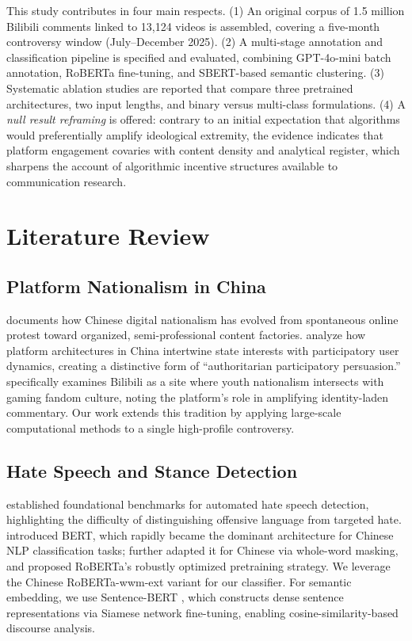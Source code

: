 \documentclass[man, 12pt, mask, floatsintext]{apa7}
\begin{document}
This study contributes in four main respects. (1) An original corpus of 1.5 million Bilibili comments linked to 13,124 videos is assembled, covering a five-month controversy window (July--December 2025). (2) A multi-stage annotation and classification pipeline is specified and evaluated, combining GPT-4o-mini batch annotation, RoBERTa fine-tuning, and SBERT-based semantic clustering. (3) Systematic ablation studies are reported that compare three pretrained architectures, two input lengths, and binary versus multi-class formulations. (4) A \textit{null result reframing} is offered: contrary to an initial expectation that algorithms would preferentially amplify ideological extremity, the evidence indicates that platform engagement covaries with content density and analytical register, which sharpens the account of algorithmic incentive structures available to communication research.

\section{Literature Review}

\subsection{Platform Nationalism in China}
\textcite{schneider2018} documents how Chinese digital nationalism has evolved from spontaneous online protest toward organized, semi-professional content factories. \textcite{repnikova2018} analyze how platform architectures in China intertwine state interests with participatory user dynamics, creating a distinctive form of ``authoritarian participatory persuasion.'' \textcite{wu2022bilibili} specifically examines Bilibili as a site where youth nationalism intersects with gaming fandom culture, noting the platform's role in amplifying identity-laden commentary. Our work extends this tradition by applying large-scale computational methods to a single high-profile controversy.

\subsection{Hate Speech and Stance Detection}
\textcite{davidson2017hate} established foundational benchmarks for automated hate speech detection, highlighting the difficulty of distinguishing offensive language from targeted hate. \textcite{devlin2019bert} introduced BERT, which rapidly became the dominant architecture for Chinese NLP classification tasks; \textcite{cui2020macbert} further adapted it for Chinese via whole-word masking, and \textcite{liu2019roberta} proposed RoBERTa's robustly optimized pretraining strategy. We leverage the Chinese RoBERTa-wwm-ext variant for our classifier. For semantic embedding, we use Sentence-BERT \parencite{reimers2019sbert}, which constructs dense sentence representations via Siamese network fine-tuning, enabling cosine-similarity-based discourse analysis.
\end{document}
